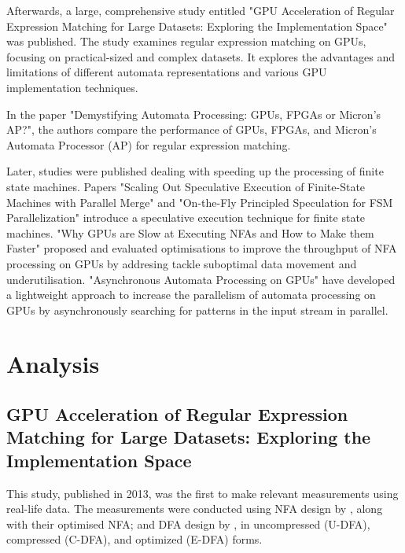\documentclass[10pt,onecolumn,twoside,english,a4paper]{article}
\begin{document}
Afterwards, a large, comprehensive study entitled "GPU Acceleration of Regular Expression Matching for Large Datasets: Exploring the Implementation Space"\cite{Becchi:regex_large_dataset} was published. The study examines regular expression matching on GPUs, focusing on practical-sized and complex datasets. It explores the advantages and limitations of different automata representations and various GPU implementation techniques.

In the paper "Demystifying Automata Processing: GPUs, FPGAs or Micron's AP?"\cite{Nourian:DemystifyingFSA}, the authors compare the performance of GPUs, FPGAs, and Micron's Automata Processor (AP) for regular expression matching.

Later, studies were published dealing with speeding up the processing of finite state machines. Papers "Scaling Out Speculative Execution of Finite-State Machines with Parallel Merge"\cite{Xia:FSA-scaling} and "On-the-Fly Principled Speculation for FSM Parallelization"\cite{zhao2015fly} introduce a speculative execution technique for finite state machines. "Why GPUs are Slow at Executing NFAs and How to Make them Faster"\cite{Liu:WhyGPUSlowNFA} proposed and evaluated optimisations to improve the throughput of NFA processing on GPUs by addresing tackle suboptimal data movement and underutilisation.
"Asynchronous Automata Processing on GPUs"\cite{Liu:Asynchronous} have developed a lightweight approach to increase the parallelism of automata processing on GPUs by asynchronously searching for patterns in the input stream in parallel.


\section{Analysis} \label{Analysis}
\subsection{GPU Acceleration of Regular Expression Matching for Large Datasets: Exploring the Implementation Space} \label{Becchi:regex_large_dataset_analysis}
This study\cite{Becchi:regex_large_dataset}, published in 2013, was the first to make relevant measurements using real-life data. The measurements were conducted using NFA design by \cite{cascarano2010infant}, along with their optimised NFA; and DFA design by \cite{becchi2007improved}, in uncompressed (U-DFA), compressed (C-DFA), and optimized (E-DFA) forms.
\end{document}
